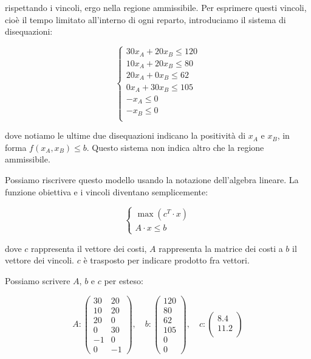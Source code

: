\documentclass[a4paper,11pt]{article}
\begin{document}
rispettando i vincoli, ergo nella regione ammissibile.
Per esprimere questi vincoli, cioè il tempo limitato all'interno di ogni reparto, introduciamo il sistema di disequazioni:

\[
	\begin{cases}
		30 x_A + 20 x_B \leq 120 \\
		10 x_A + 20 x_B \leq 80	\\
		20 x_A + 0 x_B \leq 62 \\	
		0 x_A + 30 x_B \leq 105 \\
		- x_A \leq 0 \\
		- x_B \leq 0 \\
	\end{cases}
\]

dove notiamo le ultime due disequazioni indicano la positività di $x_A$ e $x_B$, in forma $ f(x_A, x_B) \leq b $.
Questo sistema non indica altro che la regione ammissibile.

Possiamo riscrivere questo modello usando la notazione dell'algebra lineare.
La funzione obiettiva e i vincoli diventano semplicemente:

\[
	\begin{cases}
		\max(c^T \cdot x) \\
		A \cdot x \leq b	
	\end{cases}
\]

dove $c$ rappresenta il vettore dei costi, $A$ rappresenta la matrice dei costi a $b$ il vettore dei vincoli.
$c$ è trasposto per indicare prodotto fra vettori.

Possiamo scrivere $A$, $b$ e $c$ per esteso:

$$
A:
\begin{pmatrix}
	30 & 20 \\
	10 & 20 \\
	20 & 0 \\
	0 & 30 \\
	-1 & 0 \\
	0 & -1
\end{pmatrix}, \quad
b:
\begin{pmatrix}
	120 \\
	80 \\
	62 \\ 
	105 \\ 
	0 \\ 
	0 
\end{pmatrix}, \quad 
c:
\begin{pmatrix}
	8.4 \\
	11.2 \\
\end{pmatrix}
$$
\end{document}

